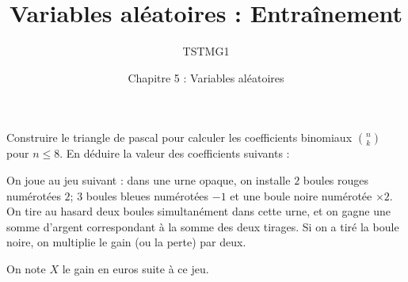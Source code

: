 \documentclass{controle}
\title{Variables aléatoires : Entraînement}
\author{TSTMG1}
\date{Chapitre 5 : Variables aléatoires}
\begin{document}
\maketitle

\begin{questions}
\question Construire le triangle de pascal pour calculer les coefficients binomiaux $\binom{n}{k}$ pour $n \leq 8$. En déduire la valeur des coefficients suivants :
\vspace*{1cm}
\question On joue au jeu suivant : dans une urne opaque, on installe $2$ boules rouges numérotées $2$; $3$ boules bleues numérotées $-1$ et une boule noire numérotée $\times 2$. On tire au hasard deux boules simultanément dans cette urne, et on gagne une somme d'argent correspondant à la somme des deux tirages. Si on a tiré la boule noire, on multiplie le gain (ou la perte) par deux.

On note $X$ le gain en euros suite à ce jeu.

\end{questions}
\end{document}
